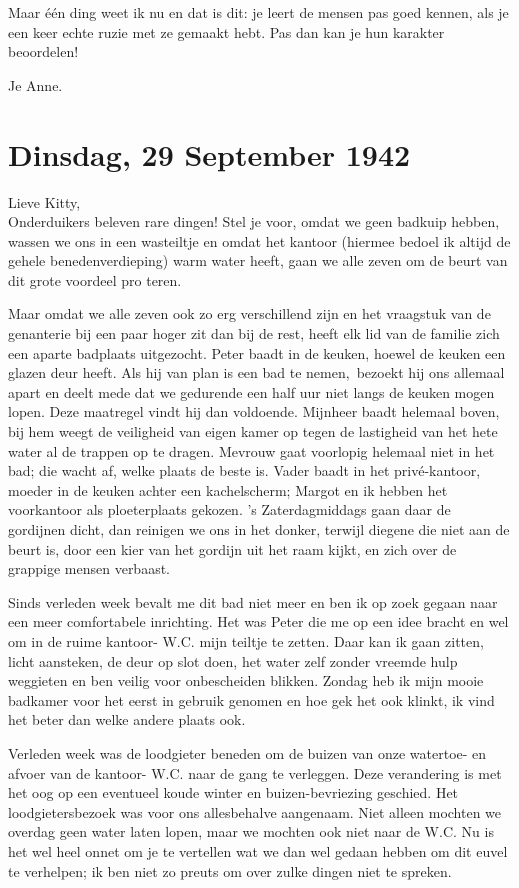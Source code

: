 \documentclass{book}
\begin{document}
Maar één ding weet ik nu en dat is dit: je leert de mensen pas goed kennen, als
je een keer echte ruzie met ze gemaakt hebt. Pas dan kan je hun karakter
beoordelen!

Je Anne.

\section*{Dinsdag, 29 September 1942}

Lieve Kitty,\\
Onderduikers beleven rare dingen! Stel je voor, omdat we geen
badkuip hebben, wassen we ons in een wasteiltje en omdat het kantoor (hiermee
bedoel ik altijd de gehele benedenverdieping) warm water heeft, gaan we alle
zeven om de beurt van dit grote voordeel pro teren.

Maar omdat we alle zeven ook zo erg verschillend zijn en het vraagstuk van de
genanterie bij een paar hoger zit dan bij de rest, heeft elk lid van de familie
zich een aparte badplaats uitgezocht. Peter baadt in de keuken, hoewel de keuken
een glazen deur heeft. Als hij van plan is een bad te nemen,~bezoekt hij ons
allemaal apart en deelt mede dat we gedurende een half uur niet langs de keuken
mogen lopen. Deze maatregel vindt hij dan voldoende. Mijnheer baadt helemaal
boven, bij hem weegt de veiligheid van eigen kamer op tegen de lastigheid van
het hete water al de trappen op te dragen. Mevrouw gaat voorlopig helemaal niet
in het bad; die wacht af, welke plaats de beste is. Vader baadt in het
privé-kantoor, moeder in de keuken achter een kachelscherm; Margot en ik hebben
het voorkantoor als ploeterplaats gekozen. 's Zaterdagmiddags gaan daar de
gordijnen dicht, dan reinigen we ons in het donker, terwijl diegene die niet aan
de beurt is, door een kier van het gordijn uit het raam kijkt, en zich over de
grappige mensen verbaast.

Sinds verleden week bevalt me dit bad niet meer en ben ik op zoek gegaan naar
een meer comfortabele inrichting. Het was Peter die me op een idee bracht en wel
om in de ruime kantoor- W.C. mijn teiltje te zetten. Daar kan ik gaan zitten,
licht aansteken, de deur op slot doen, het water zelf zonder vreemde hulp
weggieten en ben veilig voor onbescheiden blikken. Zondag heb ik mijn mooie
badkamer voor het eerst in gebruik genomen en hoe gek het ook klinkt, ik vind
het beter dan welke andere plaats ook.

Verleden week was de loodgieter beneden om de buizen van onze watertoe- en
afvoer van de kantoor- W.C. naar de gang te verleggen. Deze verandering is met
het oog op een eventueel koude winter en buizen-bevriezing geschied. Het
loodgietersbezoek was voor ons allesbehalve aangenaam. Niet alleen mochten we
overdag geen water laten lopen, maar we mochten ook niet naar de W.C. Nu is het
wel heel onnet om je te vertellen wat we dan wel gedaan hebben om dit euvel te
verhelpen; ik ben niet zo preuts om over zulke dingen niet te spreken.
\end{document}
